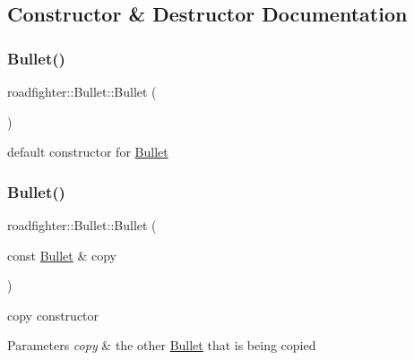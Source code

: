 \subsection{Constructor \& Destructor Documentation}
\mbox{\label{classroadfighter_1_1Bullet_abae3f231af0b423fc6ca0d0d5639fed5}} 
\subsubsection{\texorpdfstring{Bullet()}{Bullet()}\hspace{0.1cm}{\footnotesize\ttfamily [1/4]}}
{\footnotesize\ttfamily roadfighter\+::\+Bullet\+::\+Bullet (\begin{DoxyParamCaption}{ }\end{DoxyParamCaption})\hspace{0.3cm}{\ttfamily [default]}}

default constructor for \hyperlink{classroadfighter_1_1Bullet}{Bullet} \mbox{\label{classroadfighter_1_1Bullet_a5ee7b1e8b458efef1c60ed1acebb8e9e}} 
\subsubsection{\texorpdfstring{Bullet()}{Bullet()}\hspace{0.1cm}{\footnotesize\ttfamily [2/4]}}
{\footnotesize\ttfamily roadfighter\+::\+Bullet\+::\+Bullet (\begin{DoxyParamCaption}\item[{const \hyperlink{classroadfighter_1_1Bullet}{Bullet} \&}]{copy }\end{DoxyParamCaption})\hspace{0.3cm}{\ttfamily [default]}}

copy constructor 
\begin{DoxyParams}{Parameters}
{\em copy} & the other \hyperlink{classroadfighter_1_1Bullet}{Bullet} that is being copied \\
\hline
\end{DoxyParams}
\mbox{\label{classroadfighter_1_1Bullet_a20d663e607a956782dcaee5fc514da5c}} 
